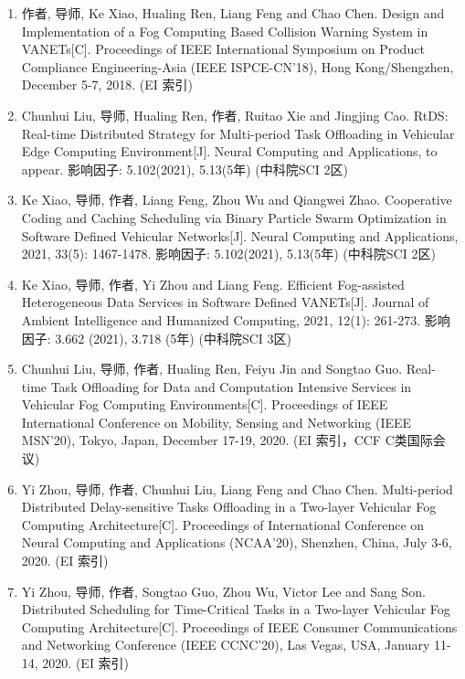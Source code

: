 \begin{enumerate}
	\item 作者\textbf{}, 导师, Ke Xiao, Hualing Ren, Liang Feng and Chao Chen. Design and Implementation of a Fog Computing Based Collision Warning System in VANETs[C]. Proceedings of IEEE International Symposium on Product Compliance Engineering-Asia (IEEE ISPCE-CN’18), Hong Kong/Shengzhen, December 5-7, 2018. (EI 索引)
	\item Chunhui Liu, 导师, Hualing Ren, 作者\textbf{}, Ruitao Xie and Jingjing Cao. RtDS: Real-time Distributed Strategy for Multi-period Task Offloading in Vehicular Edge Computing Environment[J]. Neural Computing and Applications, to appear. 影响因子: 5.102(2021), 5.13(5年) (中科院SCI 2区)
	\item Ke Xiao, 导师, 作者\textbf{}, Liang Feng, Zhou Wu and Qiangwei Zhao. Cooperative Coding and Caching Scheduling via Binary Particle Swarm Optimization in Software Defined Vehicular Networks[J]. Neural Computing and Applications, 2021, 33(5): 1467-1478. 影响因子: 5.102(2021), 5.13(5年) (中科院SCI 2区)
	\item Ke Xiao, 导师, 作者\textbf{}, Yi Zhou and Liang Feng. Efficient Fog-assisted Heterogeneous Data Services in Software Defined VANETs[J]. Journal of Ambient Intelligence and Humanized Computing, 2021, 12(1): 261-273. 影响因子: 3.662 (2021), 3.718 (5年) (中科院SCI 3区)
	\item Chunhui Liu, 导师, 作者\textbf{}, Hualing Ren, Feiyu Jin and Songtao Guo. Real-time Task Offloading for Data and Computation Intensive Services in Vehicular Fog Computing Environments[C]. Proceedings of IEEE International Conference on Mobility, Sensing and Networking (IEEE MSN’20), Tokyo, Japan, December 17-19, 2020. (EI 索引，CCF C类国际会议)
	\item Yi Zhou, 导师, 作者\textbf{}, Chunhui Liu, Liang Feng and Chao Chen. Multi-period Distributed Delay-sensitive Tasks Offloading in a Two-layer Vehicular Fog Computing Architecture[C]. Proceedings of International Conference on Neural Computing and Applications (NCAA’20), Shenzhen, China, July 3-6, 2020. (EI 索引)
	\item Yi Zhou, 导师, 作者\textbf{}, Songtao Guo, Zhou Wu, Victor Lee and Sang Son. Distributed Scheduling for Time-Critical Tasks in a Two-layer Vehicular Fog Computing Architecture[C]. Proceedings of IEEE Consumer Communications and Networking Conference (IEEE CCNC’20), Las Vegas, USA, January 11-14, 2020. (EI 索引)
\end{enumerate}

